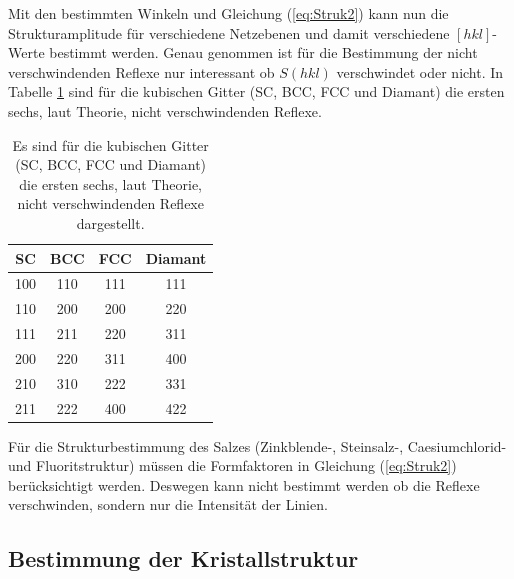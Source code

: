 Mit den bestimmten Winkeln und Gleichung (\ref{eq:Struk2}) kann nun die Strukturamplitude für verschiedene Netzebenen und damit verschiedene $[hkl]$-Werte bestimmt werden. Genau genommen ist für die Bestimmung der nicht verschwindenden Reflexe nur interessant ob $S(hkl)$ verschwindet oder nicht. In Tabelle \ref{tab:Strukturen} sind für die kubischen Gitter (SC, BCC, FCC und Diamant) die ersten sechs, laut Theorie, nicht verschwindenden Reflexe.
%
\begin{table}[h]
\centering
\caption{Es sind für die kubischen Gitter (SC, BCC, FCC und Diamant) die ersten sechs, laut Theorie, nicht verschwindenden Reflexe dargestellt.}
\label{tab:Strukturen}
\begin{tabular}{c | c | c | c}
		\hline
		SC & BCC & FCC & Diamant \\
		\hline
		100 & 110 & 111 & 111 \\
		110 & 200 & 200 & 220 \\
		111 & 211 & 220 & 311 \\
		200 & 220 & 311 & 400 \\
		210 & 310 & 222 & 331 \\
		211 & 222 & 400 & 422 \\
		\hline
\end{tabular}
\end{table}

Für die Strukturbestimmung des Salzes (Zinkblende-, Steinsalz-, Caesiumchlorid- und Fluoritstruktur) müssen die Formfaktoren in Gleichung (\ref{eq:Struk2}) berücksichtigt werden. Deswegen kann nicht bestimmt werden ob die Reflexe verschwinden, sondern nur die Intensität der Linien.

\subsection{Bestimmung der Kristallstruktur}

